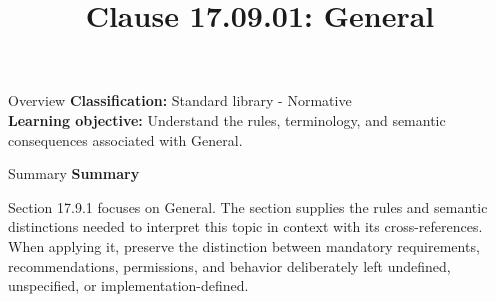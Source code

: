 \documentclass[10pt,letterpaper]{article}
\title{Clause 17.09.01: General}
\author{}
\date{}
\begin{document}
\maketitle
\begin{CornellOverviewBox}{Overview}
\textbf{Classification:} Standard library - Normative\\[2pt]
\textbf{Learning objective:} Understand the rules, terminology, and semantic consequences associated with General.
\end{CornellOverviewBox}\begin{CornellSummaryBox}{Summary}
{\sffamily\bfseries\color{Accent} Summary}\par\vspace{3pt}Section 17.9.1 focuses on General. The section supplies the rules and semantic distinctions needed to interpret this topic in context with its cross-references. When applying it, preserve the distinction between mandatory requirements, recommendations, permissions, and behavior deliberately left undefined, unspecified, or implementation-defined.
\end{CornellSummaryBox}
\end{document}
